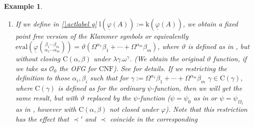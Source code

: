 \documentclass[10pt]{article}
\def \ssubitem#1{\item \label{\actlabel#1} }
\def \refsub#1#2{\ref{#1#2}}                    %
\def \refact#1{\ref{\actlabel#1}}               %
\newtheorem {example}[lemma]{Example}
\def\all{\forall}
\def \calO{{\mathcal O}}
\def\k{\mathrm{k}}
\def\lrm{\mathrm{l}}
\def\eval{\mathrm{eval}}
\def\phibar{{\underline{\varphi}}}
\def\CNF{\mathrm{CNF}}
\def\C{\mathrm{C}}
\begin{document}
\begin{example}
{\begin{enumerate}
Then $\eval(\phibar(A)) = \varphi(A)$,
where $\varphi(A)$ is defined as in \cite{Schuette54}, based
on $\varphi(\alpha):= \omega^\alpha$, but
with reversed order of the columns. We prove this by 
induction on $<'_\calO$:\\ 
If $A = \phibar(\alpha,0)$, then we can easily show
$\eval(A) = \omega^\alpha= \varphi(\alpha,0)$.\\ 
If $A= \phibar(B,\alpha,\beta,\gamma,0)$, then it follows that 
$\C(\phibar(A))$ is closed under $+$,\\
$\lambda \delta.\eval(\phibar(B,\alpha^\ast,\beta,\delta,\beta^\ast))$
for $\alpha^\ast<\alpha$, $\beta^\ast<\beta$ and 
contains further\\ 
$\eval(\phibar(B,\alpha,\beta,\gamma^\ast,0))$ for $\gamma^\ast<\gamma$,
therefore using the IH 
$\eval(\phibar(B,\alpha,\beta,\gamma,0))\geq \varphi(B,\alpha,\beta,\gamma,0)$.
On the other hand, $\varphi(A) \geq \k(\phibar(A))$,
$\varphi(A)> \lrm(\phibar(A))$, and, if $B <' A$, $\k(\phibar(B))< 
\varphi(A)$, 
by the calculations in \cite{Schuette54}
$\varphi(B) < \varphi(A)$, therefore  using the IH
$\all \gamma \in \C(\phibar(A))(\gamma < \varphi(A))$, 
$\varphi(A) \geq \eval(\phibar(A))$.
\ssubitem h If we define in \refact g $\lrm(\phibar(A)):= \k(\phibar(A))$,
we obtain a fixed point free version of the 
Klammer symbols or equivalently
$\eval(\phibar 
{\beta_1 \cdots \beta_m \choose \alpha_1 \cdots \alpha_m})= 
\vartheta(\Omega^{\alpha_1}\beta_1 +\cdots+ \Omega^{\alpha_m}\beta_m)$,
where $\vartheta$ is defined as in \cite{rathjenweiermann}, but
without closing $\C(\alpha,\beta)$ under $\lambda \gamma.\omega^\gamma$.
(We obtain the original $\vartheta$ function, if we take as
$\calO_0$ the OFG for $\CNF$). See \cite{seisenbdipl} for details.
If we restricting the definition to those $\alpha_i,\beta_i$ such that
for $\gamma:= \Omega^{\alpha_1}\beta_1 +\cdots+ \Omega^{\alpha_m}\beta_m$
$\gamma \in \C(\gamma)$, where $\C(\gamma)$ is defined as for the 
ordinary $\psi$-function, 
then we will get the same result, but with $\vartheta$ replaced
by the $\psi$-function ($\psi = \psi_0$ as in \cite{buchholzanewsys}
or $\psi= \psi_{\Omega_1}$ as in \cite{buchholzasimplified}, 
however with $\C(\alpha,\beta)$ not closed under $\varphi$).
Note that this restriction has the effect that 
$\prec'$ and $\prec$ coincide in the corresponding

\end{enumerate}}
\end{example}
\end{document}
